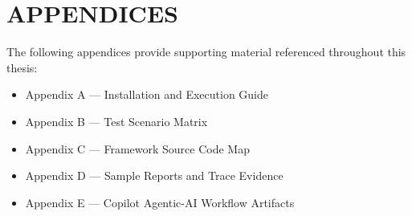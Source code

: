 \documentclass[12pt,a4paper,oneside]{report}
\begin{document}
\hypersetup{pageanchor=false}

\clearpage

\hypersetup{pageanchor=true}

\clearpage

\tableofcontents
\clearpage
{}
{}
\listoffigures
\clearpage
{}
{}
\listoftables
\clearpage


\clearpage

\clearpage

\clearpage

\clearpage

\clearpage









\clearpage
{}
{}
\chapter*{APPENDICES}
\noindent The following appendices provide supporting material referenced throughout this thesis:
\begin{itemize}[leftmargin=2em,itemsep=0.2em]
  \item Appendix A --- Installation and Execution Guide
  \item Appendix B --- Test Scenario Matrix
  \item Appendix C --- Framework Source Code Map
  \item Appendix D --- Sample Reports and Trace Evidence
  \item Appendix E --- Copilot Agentic-AI Workflow Artifacts
\end{itemize}







\clearpage
{}
\printbibliography[heading=thesisbib,title={Reference List}]
\end{document}
